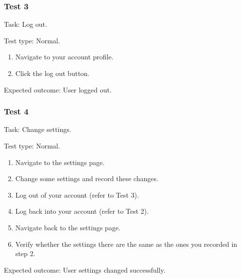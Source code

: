 {\color{gray} \hrulefill}

\vspace{0.2cm}

\subsubsection{Test 3}

{\sffamily Task:} Log out.\\ 

{\color{gray} \hrulefill}

{\sffamily Test type: Normal.}\\

\begin{enumerate}
  \item Navigate to your account profile.
  \item Click the log out button.
\end{enumerate}

{\sffamily Expected outcome:} User logged out. \\ 

{\color{gray} \hrulefill}

\vspace{0.2cm}

\subsubsection{Test 4}

{\sffamily Task:} Change settings.\\ 

{\color{gray} \hrulefill}

{\sffamily Test type: Normal.}\\

\begin{enumerate}
  \item Navigate to the settings page.
  \item Change some settings and record these changes.
  \item Log out of your account (refer to Test 3). 
  \item Log back into your account (refer to Test 2).
  \item Navigate back to the settings page.
  \item Verify whether the settings there are the same as the ones you recorded in step 2.
\end{enumerate}

{\sffamily Expected outcome:} User settings changed successfully. \\

